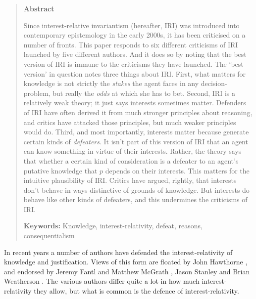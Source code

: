 \providecommand{\objrep}[2]{
\bigskip
\noindent \textit{Objection}: #1

\medskip
\noindent \textit{Reply}: #2

}

\providecommand{\argconc}{
\renewcommand{\labelenumi}{\Alph{enumi}.}
\setcounter{enumi}{2}
}

\providecommand{\numbex}[2]{
\begin{enumerate}
\setcounter{enumi}{\value{paper}}
\renewcommand{\labelenumi}{(\arabic{enumi})}
#2
\end{enumerate}
\addtocounter{paper}{#1}}

\begin{quote}
\textbf{Abstract}

Since interest-relative invariantism (hereafter, IRI) was introduced into contemporary epistemology in the early 2000s, it has been criticised on a number of fronts. This paper responds to six different criticisms of IRI launched by five different authors. And it does so by noting that the best version of IRI is immune to the criticisms they have launched. The `best version' in question notes three things about IRI. First, what matters for knowledge is not strictly the \textit{stakes} the agent faces in any decision-problem, but really the \textit{odds} at which she has to bet. Second, IRI is a relatively weak theory; it just says interests sometimes matter. Defenders of IRI have often derived it from much stronger principles about reasoning, and critics have attacked those principles, but much weaker principles would do. Third, and most importantly, interests matter because generate certain kinds of \textit{defeaters}. It isn't part of this version of IRI that an agent can know something in virtue of their interests. Rather, the theory says that whether a certain kind of consideration is a defeater to an agent's putative knowledge that $p$ depends on their interests. This matters for the intuitive plausibility of IRI. Critics have argued, rightly, that interests don't behave in ways distinctive of grounds of knowledge. But interests do behave like other kinds of defeaters, and this undermines the criticisms of IRI.

\textbf{Keywords:} Knowledge, interest-relativity, defeat, reasons, consequentialism

\end{quote}

\noindent In recent years a number of authors have defended the interest-relativity of knowledge and justification.   Views of this form are floated by John Hawthorne \citeyearpar{Hawthorne2004}, and endorsed by Jeremy Fantl and Matthew McGrath \citeyearpar{Fantl2002, FantlMcGrath2009}, Jason Stanley \citeyearpar{Stanley2005-STAKAP} and Brian Weatherson \citeyearpar{Weatherson2005-WEACWD}. The various authors differ quite a lot in how much interest-relativity they allow, but what is common is the defence of interest-relativity.

